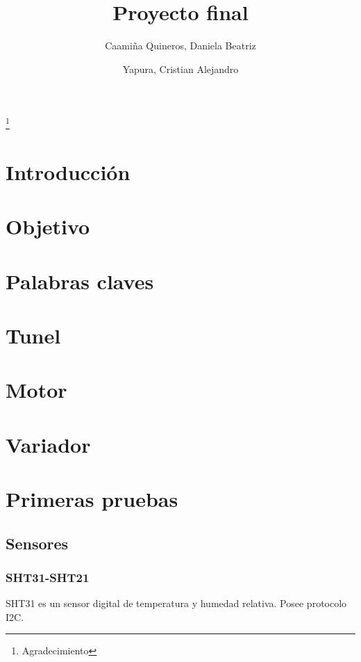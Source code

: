\documentclass[12pt,a4paper]{article}
\author{Caamiña Quineros, Daniela Beatriz\\ \and Yapura, Cristian Alejandro}
\title{Proyecto final}
\begin{document}
	\maketitle
	\newpage
	\thanks{Agradecimiento}
	\newpage
	\tableofcontents
	\newpage
	\listoffigures
	\newpage

	\section{Introducción}
	

	\section{Objetivo}
	

	\section{Palabras claves}
	

	\section{Tunel}
		

	\section{Motor}
	

	\section{Variador}
	
	


	
	
		

	\section{Primeras pruebas}
	\subsection{Sensores}
	\subsubsection{SHT31-SHT21}
	SHT31 es un sensor digital de temperatura y humedad relativa. Posee protocolo I2C.
\end{document}
